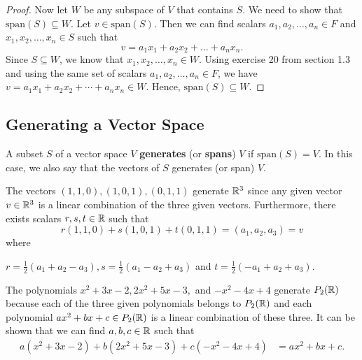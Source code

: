 \begin{proof}
Now let \( W  \) be any subspace of \( V  \) that contains \( S  \).  We need to show that \( \text{span}(S) \subseteq W  \). Let \( v \in \text{span}(S) \). Then we can find scalars \( a_{1}, a_{2}, \dots, a_{n} \in F    \) and \( x_{1} , x_{2} , \dots, x_{n} \in S  \) such that 
\[  v = a_{1} x_{1} + a_{2} x_{2} + \dots + a_{n} x_{n}.   \]
Since \( S \subseteq W  \), we know that \( x_{1}, x_{2} , \dots , x_{n} \in W  \). Using exercise 20 from section 1.3 and using the same set of scalars \( a_{1}, a_{2}, \dots, a_{n} \in F  \), we have \( v = a_{1} x_{1} + a_{2} x_{2} + \cdots + a_{n} x_{n} \in W  \). Hence, \( \text{span}(S) \subseteq W  \).
\end{proof}

\subsection{Generating a Vector Space}

\begin{definition}
    A subset \( S  \) of a vector space \( V  \) \textbf{generates} (or \textbf{spans}) \( V  \) if \( \text{span}(S) = V  \). In this case, we also say that the vectors of \( S  \) generates (or span) \( V  \).
\end{definition}

\begin{eg}[Vectors in \( \R^3 \)]
    The vectors \( (1,1,0) , (1,0,1) , (0,1,1)   \) generate \( \mathbb{R}^{3} \) since any given vector \( v \in \mathbb{R}^{3}  \) is a linear combination of the three given vectors. Furthermore, there exists scalars \( r,s,t \in \mathbb{R} \) such that
    \[  r(1,1,0) + s(1,0,1) + t(0,1,1) = (a_{1}, a_{2} , a_{3}) = v \]
    where
    \begin{center}
       \( r = \frac{ 1 }{ 2 }  (a_{1} + a_{2} - a_{3}), s = \frac{ 1 }{ 2 }   (a_{1} - a_{2} + a_{3}) \) and \( t = \frac{ 1 }{ 2 }  (-a_{1} + a_{2} + a_{3}) \). 
    \end{center}
\end{eg}

\begin{eg}[Polynomials]\label{Generating Polynomials section 1.4}
   The polynomials \( x^{2} + 3x - 2, 2x^{2} + 5x - 3,   \) and \( -x^{2} - 4x + 4  \) generate \( P_{2}(\mathbb{R} ) \) because each of the three given polynomials belongs to \( P_{2}(\mathbb{R}) \) and each polynomial \( ax^{2} + bx + c \in P_{2}(\mathbb{R}) \) is a linear combination of these three. It can be shown that we can find \( a,b,c   \in \mathbb{R}  \) such that 
   \begin{align*}
   a (x^{2} + 3x - 2)   + b (2x^{2} + 5x - 3) +  c (-x^{2} - 4x + 4) &= ax^{2} + bx + c.   
\end{align*}
\end{eg}

